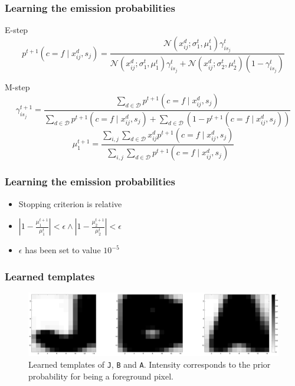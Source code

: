 \documentclass{beamer}
\begin{document}
\begin{frame}
  \frametitle{Learning the emission probabilities}
\begin{block}{E-step}
	\[
  p^{t+1}( c=f \mid x^d_{ij}, s_j) =
  \frac{\mathcal{N}(x^d_{ij};\sigma_1^t,\mu_1^t)\gamma_{is_j}^t}{\mathcal{N}(x^d_{ij};\sigma_1^t,\mu_1^t)\gamma_{is_j}^t+\mathcal{N}(x^d_{ij};\sigma_2^t,\mu_2^t)(1-\gamma_{is_j}^t)}
\]
	\end{block}

\begin{block}{M-step}
\[
  \gamma_{is_j}^{t+1} = \frac{\sum_{d \in \mathcal{D}} p^{t+1}( c=f \mid x^d_{ij}, s_j)}{\sum_{d \in \mathcal{D}} p^{t+1}( c=f \mid x^d_{ij}, s_j)+ \sum_{d \in \mathcal{D}} (1-p^{t+1}( c=f \mid x^d_{ij}, s_j))}
\]
\[
  \mu_1^{t+1} = \frac{\sum_{i,j} \sum_{d \in \mathcal{D}} x^d_{
      ij} p^{t+1}( c=f \mid x^d_{ij}, s_j)}{\sum_{i,j} \sum_{d \in
      \mathcal{D}} p^{t+1}( c=f \mid x^d_{ij}, s_j)}
\]
\end{block}  
\end{frame}

\begin{frame}
  \frametitle{Learning the emission probabilities}
\begin{itemize}
\item Stopping criterion is relative
\item  $|1-\frac{\mu_1^{t+1}}{\mu_1^{t}}| < \epsilon \wedge
|1-\frac{\mu_2^{t+1}}{\mu_2^{t}}| < \epsilon$
\item$\epsilon$ has been set to value $10^{-5}$
\end{itemize}  
\end{frame}

\begin{frame}
  \frametitle{Learned templates}
\begin{figure}[htp]
\centering
\includegraphics[width=\linewidth]{pics/jba.png}
\caption{Learned templates of \texttt{J}, \texttt{B} and
  \texttt{A}. Intensity corresponds to the prior probability for being
  a foreground pixel.}
\label{fig:templates}
\end{figure}
\end{frame}
\end{document}
